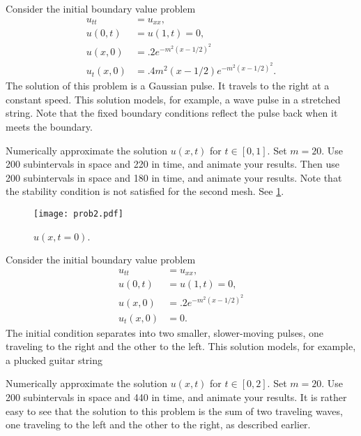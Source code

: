 \begin{problem}
\label{prob:prob2}
Consider the initial boundary value problem
\begin{align*}
	u_{tt} &= u_{xx}, \\
	u(0,t) &= u(1,t) = 0, \\
	u(x,0) &= .2e^{-m^2(x-1/2)^2}\\
	u_t(x,0) &= .4m^2(x-1/2)e^{-m^2(x-1/2)^2}.
\end{align*}
The solution of this problem is a Gaussian pulse.
It travels to the right at a constant speed.
This solution models, for example, a wave pulse in a stretched string.
Note that the fixed boundary conditions reflect the pulse back when it meets the boundary.

Numerically approximate the solution $u(x,t)$ for $t \in \left[0, 1\right]$.
Set $m=20$.
Use 200 subintervals in space and 220 in time, and animate your results.
Then use 200 subintervals in space and 180 in time, and animate your results.
Note that the stability condition is not satisfied for the second mesh.
See \ref{fig:waveeqn:prob2}.

\begin{figure}[H]
\centering
\texttt{[image: prob2.pdf]}
\caption{$u(x,t=0)$.}
\label{fig:waveeqn:prob2}
\end{figure}
\end{problem}

\begin{problem}
Consider the initial boundary value problem
\begin{align*}
	u_{tt} &= u_{xx}, \\
	u(0,t) &= u(1,t) = 0, \\
	u(x,0) &= .2e^{-m^2(x-1/2)^2}\\
	u_t(x,0) &= 0.
\end{align*}
The initial condition separates into two smaller, slower-moving pulses, one traveling to the right and the other to the left.
This solution models, for example, a plucked guitar string

Numerically approximate the solution $u(x,t)$ for $t \in \left[0,2\right]$.
Set $m=20$.
Use 200 subintervals in space and 440 in time, and animate your results.
It is rather easy to see that the solution to this problem is the sum of two traveling waves, one traveling to the left and the other to the right, as described earlier.
\end{problem}

